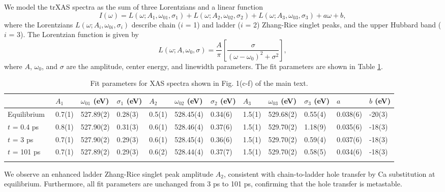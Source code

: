 \documentclass[aps, prl, preprint, superscriptaddress]{revtex4-2}
\begin{document}
We model the trXAS spectra as the sum of three Lorentzians and a linear function
\vspace{-2mm}
\begin{equation}
\label{eq4}
I(\omega) = L(\omega; A_1, \omega_{01}, \sigma_1) + L(\omega; A_2, \omega_{02}, \sigma_2) + L(\omega; A_3, \omega_{03}, \sigma_3) + a\omega + b,
\end{equation}
\vspace{-0.5mm}
where the Lorentzians $L(\omega; A_i, \omega_{0i}, \sigma_i)$ describe chain ($i$ = 1) and ladder ($i$ = 2) Zhang-Rice singlet peaks, and the upper Hubbard band ($i$ = 3). The Lorentzian function is given by
\begin{equation}
L(\omega; A, \omega_{0}, \sigma) = \frac{A}{\pi}\left[\frac{\sigma}{(\omega - \omega_0)^2 + \sigma^2}\right],
\end{equation}
where $A$, $\omega_0$, and $\sigma$ are the amplitude, center energy, and linewidth parameters. The fit parameters are shown in Table \ref{tab1}.
\vspace{-2mm}
\begin{table}[h]
\caption{Fit parameters for XAS spectra shown in Fig. 1(c-f) of the main text.}\label{tab1}
\begin{tabular}{@{}llllllllllll@{}}
\toprule
   & $A_1$ & $\omega_{01}$ (eV) & $\sigma_1$ (eV) & $A_2$  & $\omega_{02}$ (eV)  & $\sigma_2$ (eV) & $A_3$  & $\omega_{03}$ (eV)  & $\sigma_3$ (eV) & $a$ & $b$ (eV) \\
\midrule
Equilibrium~   & 0.7(1) & 527.89(2) & 0.28(3) & 0.5(1)  & 528.45(4)  & 0.34(6) & 1.5(1)  & 529.68(2)  & 0.55(4) & 0.038(6)  & -20(3) \\
$t$ = 0.4 ps~   & 0.8(1) & 527.90(2) & 0.31(3) & 0.6(1)  & 528.46(4)  & 0.37(6) & 1.5(1)  & 529.70(2)  & 1.18(9) & 0.035(6)  & -18(3)  \\
$t$ = 3 ps~   & 0.7(1) & 527.90(2) & 0.29(3) & 0.6(1)  & 528.45(4)  & 0.36(6) & 1.5(1)  & 529.70(2)  & 0.59(4) & 0.037(6)  & -18(3)  \\
$t$ = 101 ps~   & 0.7(1) & 527.89(2) & 0.29(3) & 0.6(2)  & 528.44(4)  & 0.37(7) & 1.5(1)  & 529.70(2)  & 0.58(5) & 0.034(6)  & -18(3)  \\
\botrule
\end{tabular}
\end{table}

We observe an enhanced ladder Zhang-Rice singlet peak amplitude $A_2$, consistent with chain-to-ladder hole transfer by Ca substitution at equilibrium. Furthermore, all fit parameters are unchanged from 3 ps to 101 ps, confirming that the hole transfer is metastable.
\end{document}
